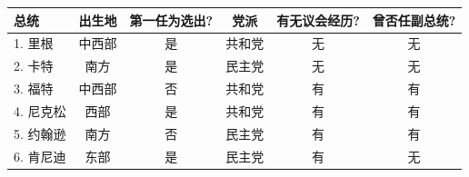 \begin{mvtable}
\label{tab:12.11}
\setlength{\tabcolsep}{9pt}%
\begin{tabular}{lccccc}
\toprule
\textbf{总统} & \textbf{出生地} & \textbf{第一任为选出?} & \textbf{党派} & \textbf{有无议会经历?} & \textbf{曾否任副总统?} \\
\midrule
1. 里根 & 中西部 & 是 & 共和党 & 无 & 无 \\
2. 卡特 & 南方 & 是 & 民主党 & 无 & 无 \\
3. 福特 & 中西部 & 否 & 共和党 & 有 & 有 \\
4. 尼克松 & 西部 & 是 & 共和党 & 有 & 有 \\
5. 约翰逊 & 南方 & 否 & 民主党 & 有 & 有 \\
6. 肯尼迪 & 东部 & 是 & 民主党 & 有 & 无 \\
\bottomrule
\end{tabular}
\end{mvtable}
